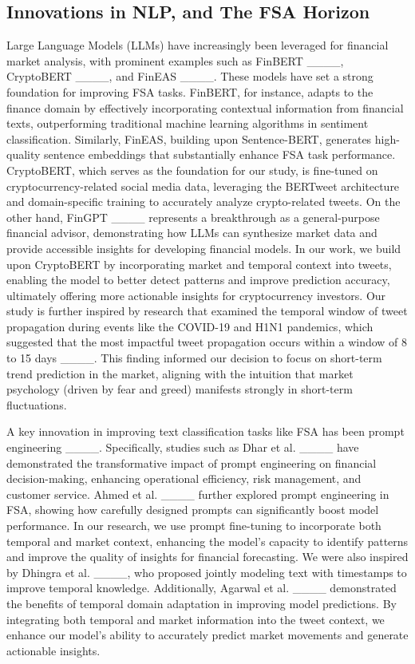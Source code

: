\subsection{Innovations in NLP, and The FSA Horizon}
Large Language Models (LLMs) have increasingly been leveraged for financial market analysis, with prominent examples such as FinBERT ____, CryptoBERT ____, and FinEAS ____. These models have set a strong foundation for improving FSA tasks. FinBERT, for instance, adapts to the finance domain by effectively incorporating contextual information from financial texts, outperforming traditional machine learning algorithms in sentiment classification. Similarly, FinEAS, building upon Sentence-BERT, generates high-quality sentence embeddings that substantially enhance FSA task performance. CryptoBERT, which serves as the foundation for our study, is fine-tuned on cryptocurrency-related social media data, leveraging the BERTweet architecture and domain-specific training to accurately analyze crypto-related tweets. On the other hand, FinGPT ____ represents a breakthrough as a general-purpose financial advisor, demonstrating how LLMs can synthesize market data and provide accessible insights for developing financial models. In our work, we build upon CryptoBERT by incorporating market and temporal context into tweets, enabling the model to better detect patterns and improve prediction accuracy, ultimately offering more actionable insights for cryptocurrency investors. Our study is further inspired by research that examined the temporal window of tweet propagation during events like the COVID-19 and H1N1 pandemics, which suggested that the most impactful tweet propagation occurs within a window of 8 to 15 days ____. This finding informed our decision to focus on short-term trend prediction in the market, aligning with the intuition that market psychology (driven by fear and greed) manifests strongly in short-term fluctuations.

A key innovation in improving text classification tasks like FSA has been prompt engineering ____. Specifically, studies such as Dhar et al. ____ have demonstrated the transformative impact of prompt engineering on financial decision-making, enhancing operational efficiency, risk management, and customer service. Ahmed et al. ____ further explored prompt engineering in FSA, showing how carefully designed prompts can significantly boost model performance. In our research, we use prompt fine-tuning to incorporate both temporal and market context, enhancing the model's capacity to identify patterns and improve the quality of insights for financial forecasting. We were also inspired by Dhingra et al. ____, who proposed jointly modeling text with timestamps to improve temporal knowledge. Additionally, Agarwal et al. ____ demonstrated the benefits of temporal domain adaptation in improving model predictions. By integrating both temporal and market information into the tweet context, we enhance our model's ability to accurately predict market movements and generate actionable insights.

